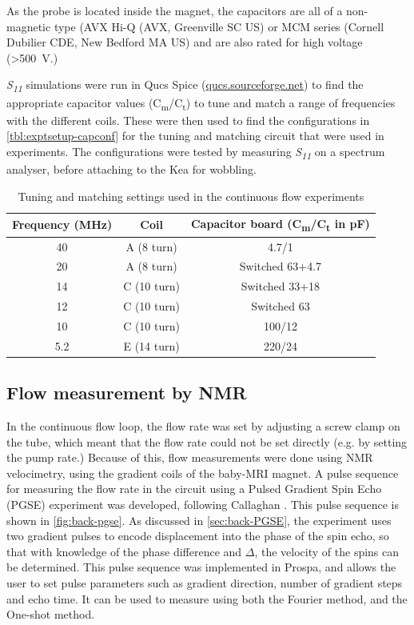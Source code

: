 As the probe is located inside the magnet, the capacitors are all of a non-magnetic type (AVX Hi-Q (AVX, Greenville SC US)  or MCM series (Cornell Dubilier CDE, New Bedford MA US) and are also rated for high voltage (\SI{>500}{V}.)

\textit{S\textsubscript{11}} simulations were run in Qucs Spice (\url{qucs.sourceforge.net}) to find the appropriate capacitor values (C\textsubscript{m}/C\textsubscript{t}) to tune and match a range of frequencies with the different coils.
These were then used to find the configurations in \autoref{tbl:exptsetup-capconf} for the tuning and matching circuit that were used in experiments.
The configurations were tested by measuring \textit{S\textsubscript{11}} on a spectrum analyser, before attaching to the Kea for wobbling.

\begin{table}[ht]
\centering
\begin{tabular}{|c|c|c|}
\hline
Frequency (\si{MHz}) & Coil & Capacitor board (C\textsubscript{m}/C\textsubscript{t} in \si{pF})\\
\hline
40 & A (8 turn) & 4.7/1 \\
20 & A (8 turn) & Switched 63+4.7 \\
14 & C (10 turn) & Switched 33+18 \\
12 & C (10 turn) & Switched 63 \\
10 & C (10 turn) & 100/12 \\
5.2 & E (14 turn) & 220/24 \\
\hline
\end{tabular}
\caption{Tuning and matching settings used in the continuous flow experiments}
\label{tbl:exptsetup-capconf}
\end{table}

\subsection{Flow measurement by NMR}
In the continuous flow loop, the flow rate was set by adjusting a screw clamp on the tube, which meant that the flow rate could not be set directly (e.g. by setting the pump rate.)
Because of this, flow measurements were done using NMR velocimetry, using the gradient coils of the baby-MRI magnet.
A pulse sequence for measuring the flow rate in the circuit using a Pulsed Gradient Spin Echo (PGSE) experiment was developed, following Callaghan \cite{CallaghanTranslationalDynamicsMagnetic2014}.
This pulse sequence is shown in \autoref{fig:back-pgse}.
As discussed in \autoref{sec:back-PGSE}, the experiment uses two gradient pulses to encode displacement into the phase of the spin echo, so that with knowledge of the phase difference and $\Delta$, the velocity of the spins can be determined.
This pulse sequence was implemented in Prospa, and allows the user to set pulse parameters such as gradient direction, number of gradient steps and echo time.
It can be used to measure using both the Fourier method, and the One-shot method.


